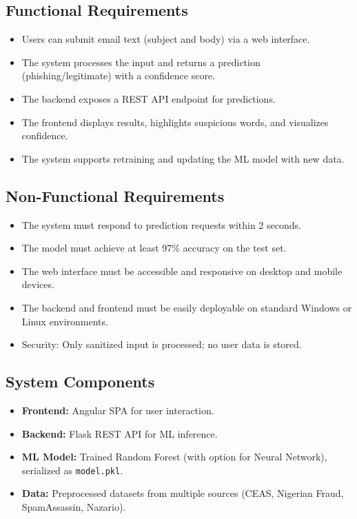 \documentclass{article}
\begin{document}
\subsection{Functional Requirements}
\begin{itemize}
    \item Users can submit email text (subject and body) via a web interface.
    \item The system processes the input and returns a prediction (phishing/legitimate) with a confidence score.
    \item The backend exposes a REST API endpoint for predictions.
    \item The frontend displays results, highlights suspicious words, and visualizes confidence.
    \item The system supports retraining and updating the ML model with new data.
\end{itemize}

\subsection{Non-Functional Requirements}
\begin{itemize}
    \item The system must respond to prediction requests within 2 seconds.
    \item The model must achieve at least 97\% accuracy on the test set.
    \item The web interface must be accessible and responsive on desktop and mobile devices.
    \item The backend and frontend must be easily deployable on standard Windows or Linux environments.
    \item Security: Only sanitized input is processed; no user data is stored.
\end{itemize}

\subsection{System Components}
\begin{itemize}
    \item \textbf{Frontend:} Angular SPA for user interaction.
    \item \textbf{Backend:} Flask REST API for ML inference.
    \item \textbf{ML Model:} Trained Random Forest (with option for Neural Network), serialized as \texttt{model.pkl}.
    \item \textbf{Data:} Preprocessed datasets from multiple sources (CEAS, Nigerian Fraud, SpamAssassin, Nazario).
\end{itemize}
\end{document}
